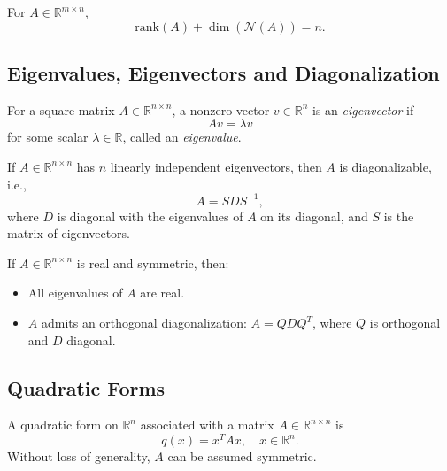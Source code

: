 \begin{theorem}
For $A \in \mathbb{R}^{m \times n}$,  
\[
\mathrm{rank}(A) + \dim(\mathcal{N}(A)) = n.
\]
\end{theorem}

\subsection{Eigenvalues, Eigenvectors and Diagonalization}

\begin{definition}
For a square matrix $A \in \mathbb{R}^{n \times n}$, a nonzero vector $v \in \mathbb{R}^n$ is an \emph{eigenvector} if 
\[
Av = \lambda v
\]
for some scalar $\lambda \in \mathbb{R}$, called an \emph{eigenvalue}.
\end{definition}

\begin{theorem}[Diagonalization]
If $A \in \mathbb{R}^{n \times n}$ has $n$ linearly independent eigenvectors, then $A$ is diagonalizable, i.e.,
\[
A = S D S^{-1},
\]
where $D$ is diagonal with the eigenvalues of $A$ on its diagonal, and $S$ is the matrix of eigenvectors.
\end{theorem}

\begin{theorem}
If $A \in \mathbb{R}^{n \times n}$ is real and symmetric, then:
\begin{itemize}
    \item All eigenvalues of $A$ are real.
    \item $A$ admits an orthogonal diagonalization: $A = Q D Q^T$, where $Q$ is orthogonal and $D$ diagonal.
\end{itemize}
\end{theorem}

\subsection{Quadratic Forms}

A quadratic form on $\mathbb{R}^n$ associated with a matrix $A \in \mathbb{R}^{n \times n}$ is
\[
q(x) = x^T A x, \quad x \in \mathbb{R}^n.
\]
Without loss of generality, $A$ can be assumed symmetric.


